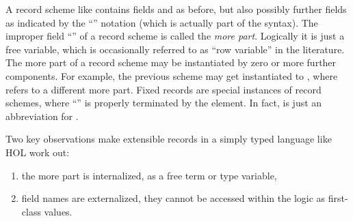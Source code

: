 \begin{isabellebody}
\begin{isamarkuptext}
  A record scheme like  contains fields
   and  as before, but also possibly further fields
  as indicated by the ``\isa{{\isachardoublequote}{\isasymdots}{\isachardoublequote}}'' notation (which is actually part
  of the syntax).  The improper field ``\isa{{\isachardoublequote}{\isasymdots}{\isachardoublequote}}'' of a record
  scheme is called the \emph{more part}.  Logically it is just a free
  variable, which is occasionally referred to as ``row variable'' in
  the literature.  The more part of a record scheme may be
  instantiated by zero or more further components.  For example, the
  previous scheme may get instantiated to , where  refers to a different more part.
  Fixed records are special instances of record schemes, where
  ``\isa{{\isachardoublequote}{\isasymdots}{\isachardoublequote}}'' is properly terminated by the 
  element.  In fact,  is just an abbreviation
  for .
  
  \medskip Two key observations make extensible records in a simply
  typed language like HOL work out:

  \begin{enumerate}

  \item the more part is internalized, as a free term or type
  variable,

  \item field names are externalized, they cannot be accessed within
  the logic as first-class values.

  \end{enumerate}


\end{isamarkuptext}
\end{isabellebody}
